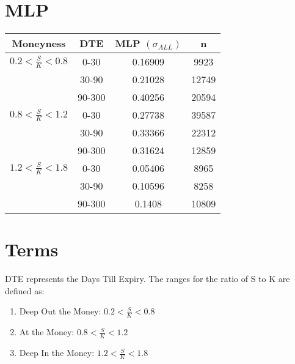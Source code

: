 \section{MLP}
\begin{center}
\begin{tabular}{c|c|c|c}
Moneyness & DTE & MLP $(\sigma_{ALL})$ & n \\
\hline
$0.2 < \frac{S}{K} < 0.8$ & 0-30 & 0.16909 & 9923 \\
& 30-90 & 0.21028 & 12749 \\
& 90-300 & 0.40256 & 20594 \\
$0.8 < \frac{S}{K} < 1.2$ & 0-30 & 0.27738 & 39587 \\
& 30-90 & 0.33366 & 22312 \\
& 90-300 & 0.31624 & 12859 \\
$1.2 < \frac{S}{K} < 1.8$ & 0-30 & 0.05406 & 8965 \\
& 30-90 & 0.10596 & 8258 \\
& 90-300 & 0.1408 & 10809 \\
\end{tabular} 
\end{center}

\section{Terms}
DTE represents the Days Till Expiry. The ranges for the ratio of S to K are defined as: 
\begin{enumerate}
    \item Deep Out the Money: $0.2 < \frac{S}{K} < 0.8$
    \item At the Money: $0.8 < \frac{S}{K} < 1.2$
    \item Deep In the Money: $1.2 < \frac{S}{K} < 1.8$
\end{enumerate}



